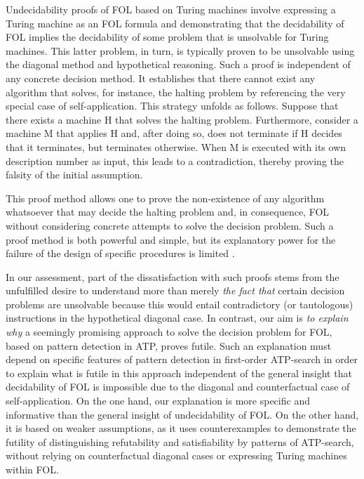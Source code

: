 \documentclass[%
  manuscript=article,   %
  year=2024,
  volume=77,
  doi=10.59203/zfn.77.694,
]{zfn}
\begin{document}
Undecidability proofs of FOL based on Turing machines involve expressing
a Turing machine as an FOL formula and demonstrating that the decidability of FOL implies the decidability of some problem that is unsolvable for Turing machines. This latter problem, in turn, is typically proven to be unsolvable using the diagonal method and hypothetical reasoning. Such a proof is independent of any concrete decision method. It establishes that there cannot exist any algorithm that solves, for instance, the halting problem by referencing the very special case of self-application. This strategy unfolds as follows. Suppose that there exists a machine H that solves the halting problem. Furthermore, consider a machine M that applies H and, after doing so, does not terminate if H decides that it terminates, but terminates otherwise. When M is executed with its own description number as input, this leads to a contradiction, thereby proving the falsity of the initial assumption.

This proof method allows one to prove the non-existence of any algorithm whatsoever that may decide the halting problem and, in consequence, FOL without considering concrete attempts to solve the decision problem. Such a proof method is both powerful and simple, but its explanatory power for the failure of the design of specific procedures is limited \parencite[cf.][246;  for reservations against his own method]{Turing}.

In our assessment, part of the dissatisfaction with such proofs stems from the unfulfilled desire to understand more than merely \emph{the fact that} certain decision problems are unsolvable because this would entail contradictory (or tautologous) instructions in the hypothetical diagonal case.
In contrast, our aim is \emph{to explain why} a seemingly promising
approach to solve the decision problem for FOL, based on pattern detection in ATP, proves futile. Such an explanation must depend on specific features of pattern detection in first-order ATP-search in order to explain what is futile in this approach independent of the general insight that decidability of FOL is impossible due to the diagonal and counterfactual case of self-application. On the one hand, our explanation is more specific and informative than the general insight of undecidability of FOL. On the other hand, it is based on weaker assumptions, as it uses counterexamples to demonstrate the futility of distinguishing refutability and satisfiability by patterns of ATP-search, without relying on counterfactual diagonal cases or expressing Turing machines within FOL.
\end{document}
